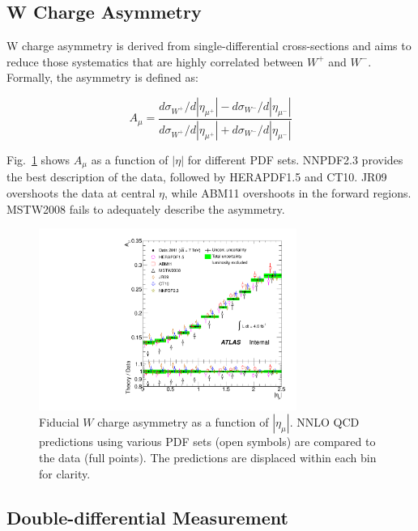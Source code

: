 \subsection{ W Charge Asymmetry }

W charge asymmetry is derived from single-differential cross-sections and aims to reduce those systematics that are highly correlated between $W^+$ and $W^-$. Formally, the asymmetry is defined as:
 
$$A_{\mu} = \frac{d\sigma_{W^{+}}/d|\eta_{\mu^{+}}| - d\sigma_{W^{-}}/d|\eta_{\mu^{-}}|}{d\sigma_{W^{+}}/d|\eta_{\mu^{+}}| + d\sigma_{W^{-}}/d|\eta_{\mu^{-}}|}$$

Fig.~\ref{fig:Comb:NNLO:Wasym25} shows $A_{\mu}$ as a function of $|\eta|$ for different PDF sets. NNPDF2.3 provides the best description of the data, followed by HERAPDF1.5 and CT10. JR09 overshoots the data at central $\eta$, while ABM11 overshoots in the forward regions. MSTW2008 fails to adequately describe the asymmetry.

\begin{figure}
\begin{center}
   \includegraphics[width=0.75\textwidth]{res/fig/Wasym25_NNLO_combined}
\end{center}
\caption{ Fiducial $W$ charge asymmetry as a function of $|\eta_{\mu}|$.
NNLO QCD predictions using various PDF sets (open symbols) are compared to the data (full points).
The predictions are displaced within each bin for clarity.
}
\label{fig:Comb:NNLO:Wasym25}
\end{figure}

\clearpage
\subsection{ Double-differential Measurement }

